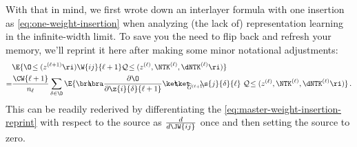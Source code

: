With that in mind, we first wrote down an interlayer formula with one insertion as \eqref{eq:one-weight-insertion} when analyzing (the lack of) representation learning in the infinite-width limit. To save you the need to flip back and refresh your memory, we'll reprint it here after making some minor notational adjustments:
\begin{align}\label{eq:one-weight-insertion-reprint-ish}
&\E{\O\!\le(z^{(\ell+1)}\ri) \W{ij}{\ell+1} \mathcal{Q}\!\le(z^{(\ell)}, \NTK^{(\ell)}, \dNTK^{(\ell)} \ri)}\, \\
=&\frac{\CW{\ell+1}}{n_{\ell}}\sum_{\delta\in\D}\E{\bra\!\!\!\bra\frac{\partial \O}{\partial \z{i}{\delta}{\ell+1}} \ket\!\!\!\ket_{\!\!\!\widehat{G}^{(\ell+1)}}\!\!\!\!  \s{j}{\delta}{\ell}\,\, \mathcal{Q}\!\le(z^{(\ell)}, \NTK^{(\ell)}, \dNTK^{(\ell)} \ri)}\, .\notag
\end{align}
This can be readily rederived by differentiating  the  \eqref{eq:master-weight-insertion-reprint} with respect to the source as $\frac{d}{d\JW{ij}}$ once and then setting the source to zero. %

